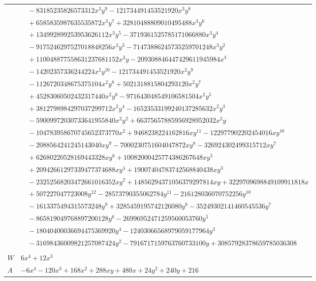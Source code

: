 \documentclass[11pt]{article}
\begin{document}
\begin{longtable}{@{}ll@{}}
 & $\quad -83185235826573312x^{3}y^{9}-121734491453521920x^{3}y^{8}$\\
 & $\quad +6585835987635535872x^{3}y^{7}+32810488809010495488x^{3}y^{6}$\\
 & $\quad +134992899253953626112x^{3}y^{5}-3719361525785171066880x^{3}y^{4}$\\
 & $\quad -9175246297527018848256x^{3}y^{3}-71473886245735259701248x^{3}y^{2}$\\
 & $\quad +110048877558631237681152x^{3}y-209308846447429611945984x^{3}$\\
 & $\quad -14202357336244224x^{2}y^{10}-121734491453521920x^{2}y^{9}$\\
 & $\quad -1126720348675375104x^{2}y^{8}+5021318815804293120x^{2}y^{7}$\\
 & $\quad +45283060502432317440x^{2}y^{6}-971643048549106581504x^{2}y^{5}$\\
 & $\quad +3812798984297037299712x^{2}y^{4}-16523533199240137285632x^{2}y^{3}$\\
 & $\quad -59009972030733641955840x^{2}y^{2}+66375657885956928952032x^{2}y$\\
 & $\quad -104783958670745652373770x^{2}+9468238224162816xy^{11}-122977902202454016xy^{10}$\\
 & $\quad -2088564241245143040xy^{9}-7000230751604047872xy^{8}-326924302499315712xy^{7}$\\
 & $\quad +62680220528169443328xy^{6}+10082000425774386267648xy^{5}$\\
 & $\quad +20942661297339477374688xy^{4}+19007404783742568840438xy^{3}$\\
 & $\quad -23252568203472661016352xy^{2}+14856294371056379297814xy+3229709698849109911818x$\\
 & $\quad +507227047723008y^{12}-28573790355062784y^{11}-216128036070752256y^{10}$\\
 & $\quad -1613375494315573248y^{9}+3285459195742126080y^{8}-35249302141460545536y^{7}$\\
 & $\quad -865819049768897200128y^{6}-26996952471259560053760y^{5}$\\
 & $\quad -18040400036694475369920y^{4}-12403066568979059177964y^{3}$\\
 & $\quad -31698436009821257087424y^{2}-7916717159763760733100y+30857928378659785036308$\\
\addlinespace[3pt]
\multicolumn{2}{@{}l}{$i=107$, $m=24$, neighbours $3,9,21,31$}\\
$W$ & $6x^{4}+12x^{3}$\\
$A$ & $-6x^{4}-120x^{3}+168x^{2}+288xy+480x+24y^{2}+240y+216$\\

\end{longtable}
\end{document}
